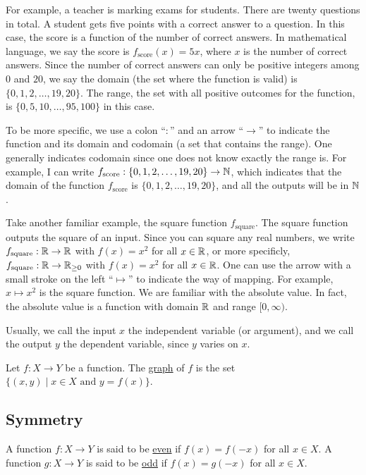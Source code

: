 \documentclass[11pt]{book}
\begin{document}
For example, a teacher is marking exams for students. There are twenty questions in total. A student gets five points with a correct answer to a question. In this case, the score is a function of the number of correct answers. In mathematical language, we say the score is $f_{\text{score}}(x)=5x$, where $x$ is the number of correct answers. Since the number of correct answers can only be positive integers among $0$ and $20$, we say the domain (the set where the function is valid) is $\{0, 1, 2, \dots, 19, 20\}$. The range, the set with all positive outcomes for the function, is $\{0, 5, 10, \dots, 95, 100\}$ in this case.

To be more specific, we use a colon ``$:$'' and an arrow ``$\to$'' to indicate the function and its domain and codomain (a set that contains the range). One generally indicates codomain since one does not know exactly the range is. For example, I can write $f_{\text{score}}:\{0, 1, 2, \dots, 19, 20\}\to\mathbb{N}$, which indicates that the domain of the function $f_{\text{score}}$ is $\{0, 1, 2, \dots, 19, 20\}$, and all the outputs will be in $\mathbb{N}$.

Take another familiar example, the square function $f_{\text{square}}$. The square function outputs the square of an input. Since you can square any real numbers, we write $f_{\text{square}}:\mathbb{R}\to\mathbb{R}$ with $f(x)=x^2$ for all $x\in\mathbb{R}$, or more specificly, $f_{\text{square}}:\mathbb{R}\to\mathbb{R}_{\geq0}$ with $f(x)=x^2$ for all $x\in\mathbb{R}$. One can use the arrow with a small stroke on the left ``$\mapsto$'' to indicate the way of mapping. For example, $x\mapsto x^2$ is the square function. We are familiar with the absolute value. In fact, the absolute value is a function with domain $\mathbb{R}$ and range $[0, \infty)$.

Usually, we call the input $x$ the independent variable (or argument), and we call the output $y$ the dependent variable, since $y$ varies on $x$.

\begin{definition}[Graph]
    Let $f:X\to Y$ be a function. The \underline{graph} of $f$ is the set $\{(x, y)\mid x\in X\text{ and }y=f(x)\}.$
\end{definition}

\subsection*{Symmetry}

\begin{definition}
    A function $f:X\to Y$ is said to be \underline{even} if $f(x)=f(-x)$ for all $x\in X$. A function $g:X\to Y$ is said to be \underline{odd} if $f(x)=g(-x)$ for all $x\in X$.
\end{definition}
\end{document}
